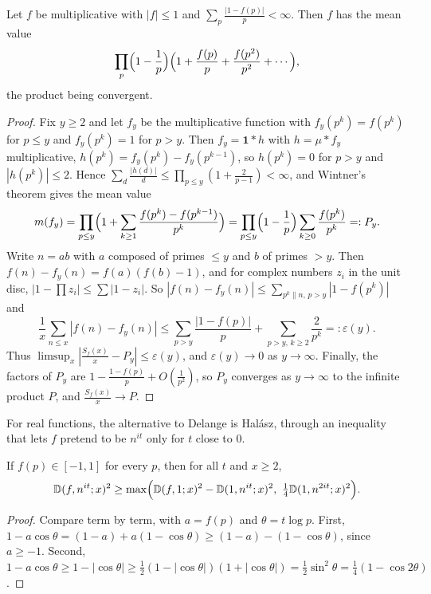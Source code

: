 \begin{theorem}[Delange]\label{thm:delange}
Let $f$ be multiplicative with $|f|\le1$ and $\sum_p\frac{|1-f(p)|}p<\infty$. Then $f$ has the mean value
\[
\prod_p\Bigl(1-\frac1p\Bigr)\Bigl(1+\frac{f(p)}p+\frac{f(p^2)}{p^2}+\cdots\Bigr),
\]
the product being convergent.
\end{theorem}
\begin{proof}
Fix $y\ge2$ and let $f_y$ be the multiplicative function with $f_y(p^k)=f(p^k)$ for $p\le y$ and $f_y(p^k)=1$ for $p>y$. Then $f_y=\mathbf1*h$ with $h=\mu*f_y$ multiplicative, $h(p^k)=f_y(p^k)-f_y(p^{k-1})$, so $h(p^k)=0$ for $p>y$ and $|h(p^k)|\le2$. Hence $\sum_d\frac{|h(d)|}d\le\prod_{p\le y}(1+\frac2{p-1})<\infty$, and Wintner's theorem gives the mean value
\[
m(f_y)=\prod_{p\le y}\Bigl(1+\sum_{k\ge1}\frac{f(p^k)-f(p^{k-1})}{p^k}\Bigr)=\prod_{p\le y}\Bigl(1-\frac1p\Bigr)\sum_{k\ge0}\frac{f(p^k)}{p^k}=:P_y.
\]
Write $n=ab$ with $a$ composed of primes $\le y$ and $b$ of primes $>y$. Then $f(n)-f_y(n)=f(a)(f(b)-1)$, and for complex numbers $z_i$ in the unit disc, $|1-\prod z_i|\le\sum|1-z_i|$. So $|f(n)-f_y(n)|\le\sum_{p^k\|n,\,p>y}|1-f(p^k)|$ and
\[
\frac1x\sum_{n\le x}|f(n)-f_y(n)|\le\sum_{p>y}\frac{|1-f(p)|}p+\sum_{p>y,\,k\ge2}\frac2{p^k}=:\varepsilon(y).
\]
Thus $\limsup_x|\frac{S_f(x)}x-P_y|\le\varepsilon(y)$, and $\varepsilon(y)\to0$ as $y\to\infty$. Finally, the factors of $P_y$ are $1-\frac{1-f(p)}p+O(\frac1{p^2})$, so $P_y$ converges as $y\to\infty$ to the infinite product $P$, and $\frac{S_f(x)}x\to P$.
\end{proof}

For real functions, the alternative to Delange is Halász, through an inequality that lets $f$ pretend to be $n^{it}$ only for $t$ close to $0$.

\begin{lemma}\label{lem:realpretend}
If $f(p)\in[-1,1]$ for every $p$, then for all $t$ and $x\ge2$,
\[
\mathbb D(f,n^{it};x)^2\ge\max\Bigl(\mathbb D(f,1;x)^2-\mathbb D(1,n^{it};x)^2,\ \tfrac14\mathbb D(1,n^{2it};x)^2\Bigr).
\]
\end{lemma}
\begin{proof}
Compare term by term, with $a=f(p)$ and $\theta=t\log p$. First, $1-a\cos\theta=(1-a)+a(1-\cos\theta)\ge(1-a)-(1-\cos\theta)$, since $a\ge-1$. Second, $1-a\cos\theta\ge1-|\cos\theta|\ge\frac12(1-|\cos\theta|)(1+|\cos\theta|)=\frac12\sin^2\theta=\frac14(1-\cos2\theta)$.
\end{proof}

